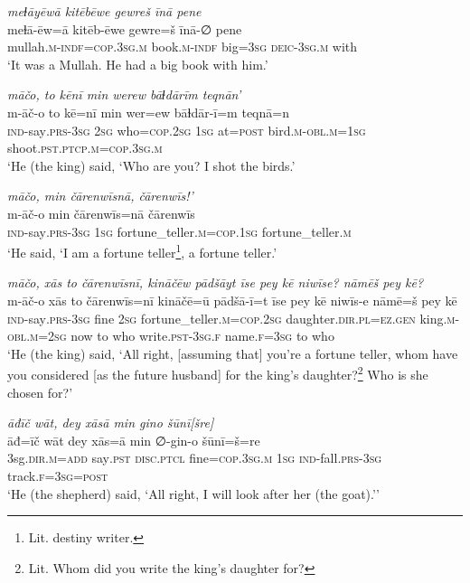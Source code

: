 \ea \label{KŠ.8}
\textit{meɫāyēwā kitēbēwe gewreš īnā pene} \\ 
\gll meɫā-ēw=ā kitēb-ēwe gewre=š īnā-∅ pene \\ 
 mullah\textsc{.m}\textsc{-indf}\textsc{=cop}\textsc{.3sg}\textsc{.m} book\textsc{.m}\textsc{-indf} big\textsc{=3sg} \textsc{deic}\textsc{-3sg}\textsc{.m} with \\ 
\glt `It was a Mullah. He had a big book with him.'
\z 
 
\ea \label{KŠ.10}
\textit{māčo, to kēnī min werew bāɫdārīm teqnān’} \\ 
\gll m-āč-o to kē=nī min wer=ew bāɫdār-ī=m teqnā=n \\ 
 \textsc{ind-}say\textsc{.prs}\textsc{-3sg} \textsc{2sg} who\textsc{=cop}\textsc{.\textsc{2sg}} \textsc{1sg} at\textsc{=\textsc{post}} bird\textsc{.m}\textsc{-obl}\textsc{.m}\textsc{=\textsc{1sg}} shoot\textsc{.pst}\textsc{.ptcp}\textsc{.m}\textsc{=cop}\textsc{.3sg}\textsc{.m} \\ 
\glt `He (the king) said, ‘Who are you? I shot the birds.'
\z 
 
\ea \label{KŠ.11}
\textit{māčo, min čārenwīsnā, čārenwīs!’} \\ 
\gll m-āč-o min čārenwīs=nā čārenwīs \\ 
 \textsc{ind-}say\textsc{.prs}\textsc{-3sg} \textsc{1sg} fortune\_teller\textsc{.m}\textsc{=cop}\textsc{.\textsc{1sg}} fortune\_teller\textsc{.m} \\ 
\glt `He said, ‘I am a fortune teller\footnote{Lit. destiny writer.}, a fortune teller.'
\z 
 
\ea \label{KŠ.12}
\textit{māčo, xās to čārenwīsnī, kināčēw pādšāyt īse pey kē niwīse? nāmēš pey kē?} \\ 
\gll m-āč-o xās to čārenwīs=nī kināčē=ū pādšā-ī=t īse pey kē niwīs-e nāmē=š pey kē \\ 
 \textsc{ind-}say\textsc{.prs}\textsc{-3sg} fine \textsc{2sg} fortune\_teller\textsc{.m}\textsc{=cop}\textsc{.\textsc{2sg}} daughter\textsc{.dir}\textsc{.pl}\textsc{=ez.gen} king\textsc{.m}\textsc{-obl}\textsc{.m}\textsc{=\textsc{2sg}} now to who write\textsc{.pst}\textsc{-3sg}\textsc{.f} name\textsc{.f}\textsc{=3sg} to who \\ 
\glt `He (the king) said, ‘All right, [assuming that] you’re a fortune teller, whom have you considered [as the future husband] for the king’s daughter?\footnote{Lit. Whom did you write the king’s daughter for?} Who is she chosen for?'
\z 
 
\ea \label{KŠ.29}
\textit{āđīč wāt, dey xāsā min gino šūnī[šre]} \\ 
\gll āđ=īč wāt dey xās=ā min ∅-gin-o šūnī=š=re \\ 
 3sg\textsc{.dir}\textsc{.m}\textsc{=add} say\textsc{.pst} \textsc{disc.ptcl} fine\textsc{=cop}\textsc{.3sg}\textsc{.m} \textsc{1sg} \textsc{ind-}fall\textsc{.prs}\textsc{-3sg} track\textsc{.f}\textsc{=3sg}\textsc{=\textsc{post}} \\ 
\glt `He (the shepherd) said, ‘All right, I will look after her (the goat).’'
\z 
 
